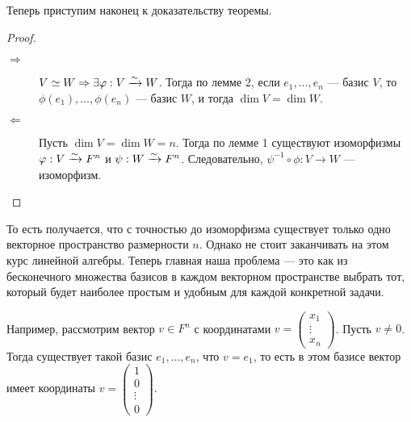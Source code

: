 Теперь приступим наконец к доказательству теоремы.
\begin{proof} \ 
\begin{description}
\item[$\Rightarrow$] $V \simeq W \Rightarrow \exists \varphi: V \xrightarrow{\sim} W$. Тогда по лемме 2, если $e_1, \ldots, e_n$ --- базис $V$, то $\phi(e_1), \ldots, \phi(e_n)$ --- базис $W$, и тогда $\dim V = \dim W$.  
\item[$\Leftarrow$] Пусть $\dim V = \dim W = n$. Тогда по лемме 1 существуют изоморфизмы $\varphi: V \xrightarrow{\sim} F^n$ и $\psi : W \xrightarrow{\sim} F^n$. Следовательно, $\psi^{-1}\circ\phi: V \rightarrow W$ --- изоморфизм.
\end{description}
\end{proof}

То есть получается, что с точностью до изоморфизма существует только одно векторное пространство размерности $n$. Однако не стоит заканчивать на этом курс линейной алгебры. Теперь главная наша проблема --- это как из бесконечного множества базисов в каждом векторном пространстве выбрать тот, который будет наиболее простым и удобным для каждой конкретной задачи. 

Например, рассмотрим вектор $v \in F^n$ с координатами $v = \begin{pmatrix*}x_1 \\ \vdots \\ x_n\end{pmatrix*}$. Пусть $v \neq 0$. Тогда существует такой базис $e_1, \ldots, e_n$, что $v = e_1$, то есть в этом базисе вектор имеет координаты $v = \begin{pmatrix*}1 \\ 0\\ \vdots\\0\end{pmatrix*}$.

